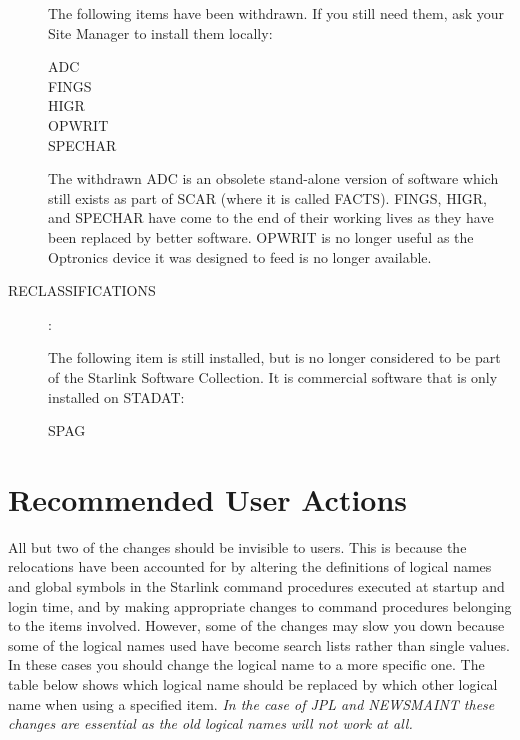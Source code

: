 \begin{description}
The following items have been withdrawn.
If you still need them, ask your Site Manager to install them locally:
\begin{description}
\item [ADC]
\item [FINGS]
\item [HIGR]
\item [OPWRIT]
\item [SPECHAR]
\end{description}
The withdrawn ADC is an obsolete stand-alone version of software which still
exists as part of SCAR (where it is called FACTS).
FINGS, HIGR, and SPECHAR have come to the end of their working lives as they
have been replaced by better software.
OPWRIT is no longer useful as the Optronics device it was designed to feed is
no longer available.

\item [RECLASSIFICATIONS] :

The following item is still installed, but is no longer considered to be part
of the Starlink Software Collection.
It is commercial software that is only installed on STADAT:
\begin{description}
\item [SPAG]
\end{description}

\end{description}

\section{Recommended User Actions}

All but two of the changes should be invisible to users.
This is because the relocations have been accounted for by altering the
definitions of logical names and global symbols in the Starlink command
procedures executed at startup and login time, and by making appropriate
changes to command procedures belonging to the items involved.
However, some of the changes may slow you down because some of the logical
names used have become search lists rather than single values.
In these cases you should change the logical name to a more specific one.
The table below shows which logical name should be replaced by which other
logical name when using a specified item.
{\em In the case of JPL and NEWSMAINT these changes are essential as the old
logical names will not work at all.}

